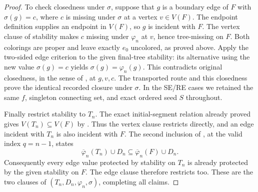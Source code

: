 \begin{proof}
To check closedness under $\sigma$, suppose that $g$ is a boundary edge
of $F$ with $\sigma(g)=c$, where $c$ is missing under $\sigma$ at a vertex
$v\in V(F)$. The endpoint definition  supplies
an endpoint in $V(F)$, so $g$ is incident with $F$.
The vertex clause of stability makes $c$ missing under $\varphi_n$ at
$v$, hence tree-missing on $F$. Both colorings are proper and leave
exactly $e_0$ uncolored, as proved above. Apply the two-sided edge
criterion  to the given final-tree stability: its alternative
using the new value $\sigma(g)=c$ yields $\sigma(g)=\varphi_n(g)$.
This contradicts original closedness, in the sense of
, at $g,v,c$. The transported route and
this closedness prove the identical recorded closure under $\sigma$.
In the SE/RE cases we retained the same $f$, singleton connecting set,
and exact ordered seed $S$ throughout.

Finally restrict stability to $T_n$. The exact initial-segment relation
already proved gives $V(T_n)\subseteq V(F)$ by
. Thus the vertex
clause restricts directly, and an edge incident with $T_n$ is also
incident with $F$. The second inclusion of
, at the valid index $q=n-1$, states
\[
 \overline\varphi_n(T_n)\cup D_n
 \subseteq\overline\varphi_n(F)\cup D_n.
\]
Consequently every edge value protected by stability on $T_n$ is already
protected by the given stability on $F$. The edge clause therefore
restricts too. These are the two clauses of
$(T_n,D_n,\varphi_n,\sigma)$, completing all
claims.
\end{proof}
